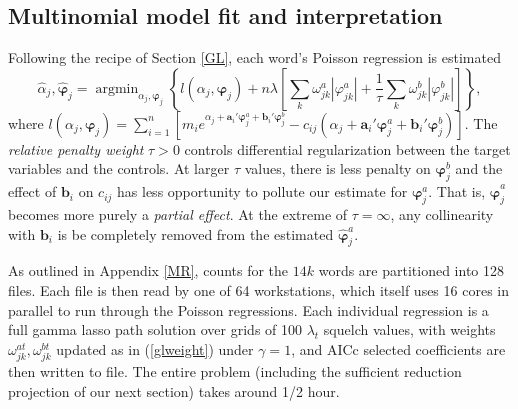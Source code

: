 \documentclass[12pt]{article}
\newcommand{\bs}[1]{\boldsymbol{#1}}
\newcommand{\bm}[1]{\mathbf{#1}}
\DeclareMathOperator*{\argmin}{argmin}
\begin{document}
\subsection{Multinomial model fit and interpretation}

Following the recipe of Section \ref{GL}, 
each word's Poisson regression is estimated 
\begin{equation}\label{yelpobj}
 \hat\alpha_j,\bs{\hat\varphi}_j = 
 \argmin_{\alpha_j,\bs{\varphi}_j} \left\{l(\alpha_j,\bs{\varphi}_j) + n \lambda \left[\sum_k \omega^a_{jk} |\varphi^a_{jk} | + \frac{1}{\tau}\sum_k \omega^b_{jk} |\varphi^b_{jk} |\right]\right\},
\end{equation}
where $l(\alpha_j, \bs{\varphi}_j) = \sum_{i=1}^n \left[ m_i e^{\alpha_j +
\bm{a}_i'\bs{\varphi}_j^a+ \bm{b}_i'\bs{\varphi}_j^b} - c_{ij}(\alpha_j +
\bm{a}_i'\bs{\varphi}_j^a+ \bm{b}_i'\bs{\varphi}_j^b)\right]$.
The {\it relative penalty weight} $\tau > 0$ controls differential
regularization between the target variables and the controls. At larger $\tau$
values, there is less penalty on $\bs{\varphi}_j^b$ and the effect of
$\bm{b}_i$ on $c_{ij}$ has less opportunity to pollute our estimate for
$\bs{\varphi}_j^a$. That is, $\bs{\hat\varphi}_j^a$ becomes more purely a {\it
partial effect}. At the extreme of $\tau = \infty$, any collinearity with
$\bm{b}_i$ is be completely removed from the estimated $\bs{\hat\varphi}_j^a$.

As outlined in Appendix \ref{MR}, counts for the $14k$ words are partitioned
into 128 files.  Each file is then read by one of 64 workstations, which
itself uses 16 cores in parallel to run through the Poisson regressions. Each
individual regression is a full gamma lasso path solution over grids of 100
$\lambda_t$ squelch values, with weights $\omega_{jk}^{at},\omega_{jk}^{bt}$
updated as in (\ref{glweight}) under $\gamma=1$, and AICc selected
coefficients are then written to file. The entire problem (including the
sufficient reduction projection of our next section) takes around 1/2 hour.
\end{document}
